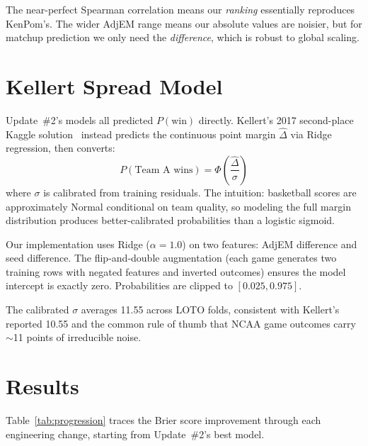 \documentclass[11pt,a4paper]{article}
\begin{document}
The near-perfect Spearman correlation means our \textit{ranking} essentially reproduces KenPom's. The wider AdjEM range means our absolute values are noisier, but for matchup prediction we only need the \textit{difference}, which is robust to global scaling.


\section{Kellert Spread Model}

Update~\#2's models all predicted $P(\text{win})$ directly. Kellert's 2017 second-place Kaggle solution~\citep{kellert2017} instead predicts the continuous point margin $\hat{\Delta}$ via Ridge regression, then converts:
\begin{equation}
    P(\text{Team A wins}) = \Phi\!\left(\frac{\hat{\Delta}}{\sigma}\right)
\end{equation}
where $\sigma$ is calibrated from training residuals. The intuition: basketball scores are approximately Normal conditional on team quality, so modeling the full margin distribution produces better-calibrated probabilities than a logistic sigmoid.

Our implementation uses Ridge ($\alpha = 1.0$) on two features: AdjEM difference and seed difference. The flip-and-double augmentation (each game generates two training rows with negated features and inverted outcomes) ensures the model intercept is exactly zero. Probabilities are clipped to $[0.025, 0.975]$.

The calibrated $\sigma$ averages 11.55 across LOTO folds, consistent with Kellert's reported 10.55 and the common rule of thumb that NCAA game outcomes carry $\sim$11 points of irreducible noise.


\section{Results}

Table~\ref{tab:progression} traces the Brier score improvement through each engineering change, starting from Update~\#2's best model.
\end{document}
